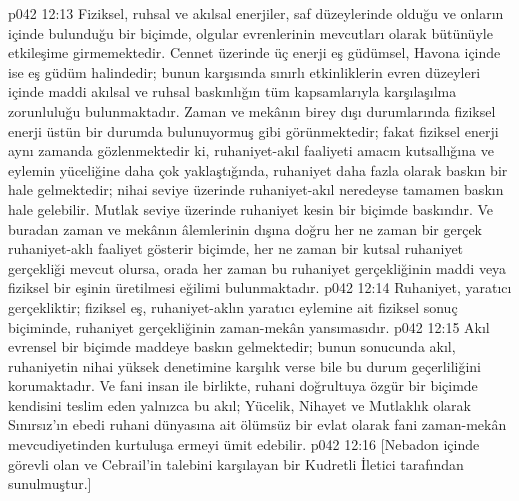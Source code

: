 \vs p042 12:13 Fiziksel, ruhsal ve akılsal enerjiler, saf düzeylerinde olduğu ve onların içinde bulunduğu bir biçimde, olgular evrenlerinin mevcutları olarak bütünüyle etkileşime girmemektedir. Cennet üzerinde üç enerji eş güdümsel, Havona içinde ise eş güdüm halindedir; bunun karşısında sınırlı etkinliklerin evren düzeyleri içinde maddi akılsal ve ruhsal baskınlığın tüm kapsamlarıyla karşılaşılma zorunluluğu bulunmaktadır. Zaman ve mekânın birey dışı durumlarında fiziksel enerji üstün bir durumda bulunuyormuş gibi görünmektedir; fakat fiziksel enerji aynı zamanda gözlenmektedir ki, ruhaniyet\hyp{}akıl faaliyeti amacın kutsallığına ve eylemin yüceliğine daha çok yaklaştığında, ruhaniyet daha fazla olarak baskın bir hale gelmektedir; nihai seviye üzerinde ruhaniyet\hyp{}akıl neredeyse tamamen baskın hale gelebilir. Mutlak seviye üzerinde ruhaniyet kesin bir biçimde baskındır. Ve buradan zaman ve mekânın âlemlerinin dışına doğru her ne zaman bir gerçek ruhaniyet\hyp{}aklı faaliyet gösterir biçimde, her ne zaman bir kutsal ruhaniyet gerçekliği mevcut olursa, orada her zaman bu ruhaniyet gerçekliğinin maddi veya fiziksel bir eşinin üretilmesi eğilimi bulunmaktadır.
\vs p042 12:14 Ruhaniyet, yaratıcı gerçekliktir; fiziksel eş, ruhaniyet\hyp{}aklın yaratıcı eylemine ait fiziksel sonuç biçiminde, ruhaniyet gerçekliğinin zaman\hyp{}mekân yansımasıdır.
\vs p042 12:15 Akıl evrensel bir biçimde maddeye baskın gelmektedir; bunun sonucunda akıl, ruhaniyetin nihai yüksek denetimine karşılık verse bile bu durum geçerliliğini korumaktadır. Ve fani insan ile birlikte, ruhani doğrultuya özgür bir biçimde kendisini teslim eden yalnızca bu akıl; Yücelik, Nihayet ve Mutlaklık olarak Sınırsız’ın ebedi ruhani dünyasına ait ölümsüz bir evlat olarak fani zaman\hyp{}mekân mevcudiyetinden kurtuluşa ermeyi ümit edebilir.
\vs p042 12:16 [Nebadon içinde görevli olan ve Cebrail’in talebini karşılayan bir Kudretli İletici tarafından sunulmuştur.]
